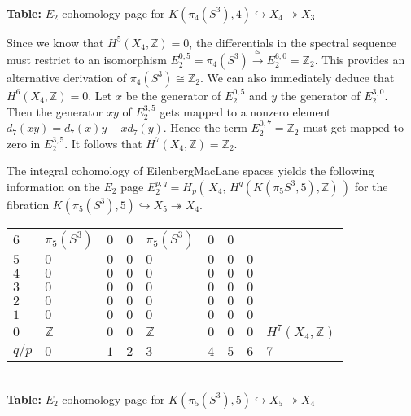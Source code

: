 \documentclass[a4paper,11pt]{report}
\begin{document}
{{\begin{center}
\\[2mm]
\textbf{Table: }$E_2$ cohomology page for $K(\pi_4(S^3),4) \hookrightarrow X_4 \twoheadrightarrow X_3$\end{center}

 Since we know that $H^5(X_4,\mathbb Z) =0$, the differentials in the spectral sequence must restrict to an isomorphism $E_2^{0,5}=\pi_4(S^3) \stackrel{\cong}{\longrightarrow} E_2^{6,0}=\mathbb Z_2$. This provides an alternative derivation of $\pi_4(S^3) \cong \mathbb Z_2$. We can also immediately deduce that $H^6(X_4,\mathbb Z)=0$. Let $x$ be the generator of $E_2^{0,5}$ and $y$ the generator of $E_2^{3,0}$. Then the generator $xy$ of $E_2^{3,5}$ gets mapped to a non\texttt{}zero element $d_7(xy)=d_7(x)y -xd_7(y)$. Hence the term $E_2^{0,7}=\mathbb Z_2$ must get mapped to zero in $E_2^{3,5}$. It follows that $H^7(X_4,\mathbb Z)=\mathbb Z_2$. 

The integral cohomology of Eilenberg\texttt{}MacLane spaces yields
the following information on the $E_2$ page $E_2^{p,q}=H_p(\,X_4,\,H^q(K(\pi_5S^3,5),\mathbb Z)\,)$ for the fibration $K(\pi_5(S^3),5) \hookrightarrow X_5 \twoheadrightarrow X_4$. \begin{center}
\begin{tabular}{l|llllllll} $6$ &
 $\pi_5(S^3)$ &
 $0$ &
 $0$ &
 $\pi_5(S^3)$ &
 $0$ &
 $0$ &
 &
 \\
 $5$ &
 $0$ &
 $0$ &
 $0$ &
 $0$ &
 $0$ &
 $0$ &
 $0$ &
 \\
 $4$ &
 $0$ &
 $0$ &
 $0$ &
 $0$ &
 $0$ &
 $0$ &
 $0$ &
 \\
 $3$ &
 $0$ &
 $0$ &
 $0$ &
 $0$ &
 $0$ &
 $0$ &
 $0$ &
 \\
 $2$ &
 $0$ &
 $0$ &
 $0$ &
 $0$ &
 $0$ &
 $0$ &
 $0$ &
 \\
 $1$ &
 $0$ &
 $0$ &
 $0$ &
 $0$ &
 $0$ &
 $0$ &
 $0$ &
 \\
 $0$ &
 $\mathbb Z$ &
 $0$ &
 $0$ &
 $\mathbb Z$ &
 $0$ &
 $0$ &
 $0$ &
 $H^7(X_4,\mathbb Z)$ \\
 $q/p$ &
 $0$ &
 $1$ &
 $2$ &
 $3$ &
 $4$ &
 $5$ &
 $6$ &
 $7$ \\
\end{tabular}\\[2mm]
\textbf{Table: }$E_2$ cohomology page for $K(\pi_5(S^3),5) \hookrightarrow X_5 \twoheadrightarrow X_4$\end{center}

}}
\end{document}
